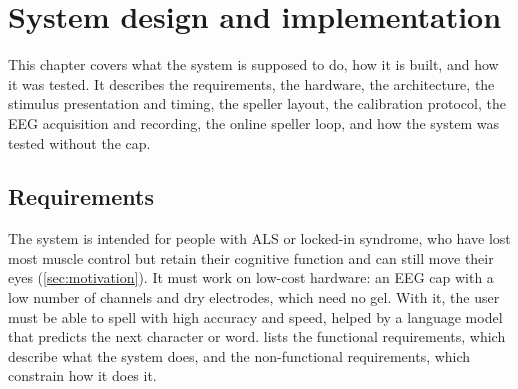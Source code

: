
\chapter{System design and implementation}
\label{ch:system}

This chapter covers what the system is supposed to do, how it is built, and how it was tested. It describes the
requirements, the hardware, the architecture, the stimulus presentation and timing, the speller layout, the calibration protocol,
the \ac{EEG} acquisition and recording, the online speller loop, and how the system was tested without the cap.

\section{Requirements}
\label{sec:requirements}

The system is intended for people with \ac{ALS} or locked-in syndrome, who have
lost most muscle control but retain their cognitive function and can still move their
eyes (\cref{sec:motivation}).
It must work on low-cost hardware: an \ac{EEG} cap with a low number of channels and
dry electrodes, which need no gel.
With it, the user must be able to spell with high accuracy and speed, helped by a
language model that predicts the next character or word.
 lists the functional requirements, which describe what the
system does, and the non-functional requirements, which constrain how it does it.

